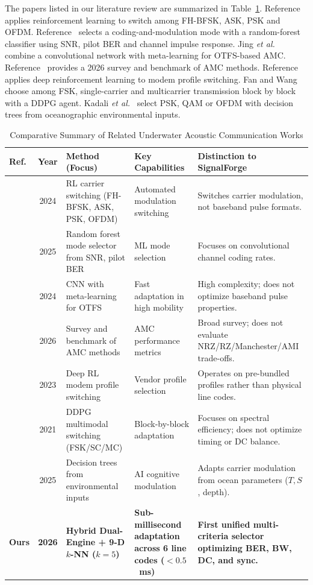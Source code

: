\documentclass[conference]{IEEEtran}
\begin{document}
The papers listed in our literature review are summarized in Table~\ref{tab:lit_review}. Reference~\cite{li2024reinforcement} applies reinforcement learning to switch among FH-BFSK, ASK, PSK and OFDM. Reference~\cite{chen2025optimal} selects a coding-and-modulation mode with a random-forest classifier using SNR, pilot BER and channel impulse response. Jing \textit{et al.}~\cite{jing2024adaptive} combine a convolutional network with meta-learning for OTFS-based AMC. Reference~\cite{survey2026amc} provides a 2026 survey and benchmark of AMC methods. Reference~\cite{adaptive2023profile} applies deep reinforcement learning to modem profile switching. Fan and Wang~\cite{fan2021adaptive} choose among FSK, single-carrier and multicarrier transmission block by block with a DDPG agent. Kadali \textit{et al.}~\cite{kadali2025ai} select PSK, QAM or OFDM with decision trees from oceanographic environmental inputs.

\begin{table}[!t]
\centering
\caption{Comparative Summary of Related Underwater Acoustic Communication Works}
\label{tab:lit_review}
\begin{tabularx}{\textwidth}{@{}l c p{3.2cm} X X@{}}
\toprule
\textbf{Ref.} & \textbf{Year} & \textbf{Method (Focus)} & \textbf{Key Capabilities} & \textbf{Distinction to SignalForge} \\
\midrule
\cite{li2024reinforcement} & 2024 & RL carrier switching (FH-BFSK, ASK, PSK, OFDM) & Automated modulation switching & Switches carrier modulation, not baseband pulse formats. \\
\cite{chen2025optimal} & 2025 & Random forest mode selector from SNR, pilot BER & ML mode selection & Focuses on convolutional channel coding rates. \\
\cite{jing2024adaptive} & 2024 & CNN with meta-learning for OTFS & Fast adaptation in high mobility & High complexity; does not optimize baseband pulse properties. \\
\cite{survey2026amc} & 2026 & Survey and benchmark of AMC methods & AMC performance metrics & Broad survey; does not evaluate NRZ/RZ/Manchester/AMI trade-offs. \\
\cite{adaptive2023profile} & 2023 & Deep RL modem profile switching & Vendor profile selection & Operates on pre-bundled profiles rather than physical line codes. \\
\cite{fan2021adaptive} & 2021 & DDPG multimodal switching (FSK/SC/MC) & Block-by-block adaptation & Focuses on spectral efficiency; does not optimize timing or DC balance. \\
\cite{kadali2025ai} & 2025 & Decision trees from environmental inputs & AI cognitive modulation & Adapts carrier modulation from ocean parameters ($T, S$, depth). \\
\midrule
\textbf{Ours} & \textbf{2026} & \textbf{Hybrid Dual-Engine + 9-D $k$-NN ($k=5$)} & \textbf{Sub-millisecond adaptation across 6 line codes ($< 0.5$~ms)} & \textbf{First unified multi-criteria selector optimizing BER, BW, DC, and sync.} \\
\bottomrule
\end{tabularx}
\end{table}
\end{document}
